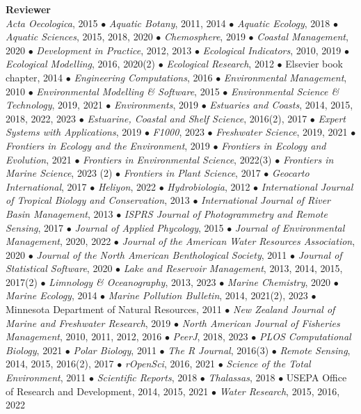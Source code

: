 \documentclass[letterpaper,12pt]{article}
\begin{document}
{\bf Reviewer}\hfill \\
\textit{Acta Oecologica}, 2015 $\bullet$ \textit{Aquatic Botany}, 2011, 2014 $\bullet$ \textit{Aquatic Ecology}, 2018 $\bullet$ \textit{Aquatic Sciences}, 2015, 2018, 2020 $\bullet$ \textit{Chemosphere}, 2019 $\bullet$ \textit{Coastal Management}, 2020 $\bullet$ \textit{Development in Practice}, 2012, 2013 $\bullet$ \textit{Ecological Indicators}, 2010, 2019 $\bullet$ \textit{Ecological Modelling}, 2016, 2020(2) $\bullet$ \textit{Ecological Research}, 2012 $\bullet$ Elsevier book chapter, 2014 $\bullet$ \textit{Engineering Computations}, 2016 $\bullet$ \textit{Environmental Management}, 2010 $\bullet$ \textit{Environmental Modelling \& Software}, 2015 $\bullet$ \textit{Environmental Science \& Technology}, 2019, 2021 $\bullet$ \textit{Environments}, 2019 $\bullet$ \textit{Estuaries and Coasts}, 2014, 2015, 2018, 2022, 2023 $\bullet$ \textit{Estuarine, Coastal and Shelf Science}, 2016(2), 2017 $\bullet$ \textit{Expert Systems with Applications}, 2019 $\bullet$ \textit{F1000}, 2023 $\bullet$ \textit{Freshwater Science}, 2019, 2021 $\bullet$ \textit{Frontiers in Ecology and the Environment}, 2019 $\bullet$ \textit{Frontiers in Ecology and Evolution}, 2021 $\bullet$ \textit{Frontiers in Environmental Science}, 2022(3) $\bullet$ \textit{Frontiers in Marine Science}, 2023 (2) $\bullet$ \textit{Frontiers in Plant Science}, 2017 $\bullet$ \textit{Geocarto International}, 2017 $\bullet$ \textit{Heliyon}, 2022 $\bullet$ \textit{Hydrobiologia}, 2012 $\bullet$ \textit{International Journal of Tropical Biology and Conservation}, 2013 $\bullet$ \textit{International Journal of River Basin Management}, 2013 $\bullet$ \textit{ISPRS Journal of Photogrammetry and Remote Sensing}, 2017 $\bullet$ \textit{Journal of Applied Phycology}, 2015 $\bullet$ \textit{Journal of Environmental Management}, 2020, 2022 $\bullet$ \textit{Journal of the American Water Resources Association}, 2020 $\bullet$ \textit{Journal of the North American Benthological Society}, 2011 $\bullet$ \textit{Journal of Statistical Software}, 2020 $\bullet$ \textit{Lake and Reservoir Management}, 2013, 2014, 2015, 2017(2) $\bullet$ \textit{Limnology \& Oceanography}, 2013, 2023 $\bullet$ \textit{Marine Chemistry}, 2020 $\bullet$ \textit{Marine Ecology}, 2014 $\bullet$ \textit{Marine Pollution Bulletin}, 2014, 2021(2), 2023 $\bullet$ Minnesota Department of Natural Resources, 2011 $\bullet$ \textit{New Zealand Journal of Marine and Freshwater Research}, 2019 $\bullet$ \textit{North American Journal of Fisheries Management}, 2010, 2011, 2012, 2016 $\bullet$ \textit{PeerJ}, 2018, 2023 $\bullet$ \textit{PLOS Computational Biology}, 2021 $\bullet$ \textit{Polar Biology}, 2011 $\bullet$ \textit{The R Journal}, 2016(3) $\bullet$ \textit{Remote Sensing}, 2014, 2015, 2016(2), 2017 $\bullet$ \textit{rOpenSci}, 2016, 2021 $\bullet$ \textit{Science of the Total Environment}, 2011 $\bullet$ \textit{Scientific Reports}, 2018 $\bullet$ \textit{Thalassas}, 2018 $\bullet$ USEPA Office of Research and Development, 2014, 2015, 2021 $\bullet$ \textit{Water Research}, 2015, 2016, 2022
\end{document}
